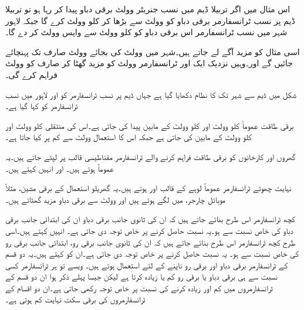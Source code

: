 اس مثال میں اگر تربیلا ڈیم میں نسب جنریٹر  وولٹ برقی دباو پیدا کر رہا ہو تو تربیلا ڈیم  پر نسب  ٹرانسفارمر برقی دباو کو  وولٹ سے بڑھا کر  کلو وولٹ کرے گا جبکہ لاہور شہر میں نسب  ٹرانسفارمر اس برقی دباو کو  کلو وولٹ سے واپس  وولٹ کر دے گا۔

اسی مثال کو مزید آگے لے جاتے ہیں۔شہر میں  وولٹ کی بجائے  وولٹ صارف تک پہنچائے جائیں گے اور۔وہیں نزدیک ایک اور ٹرانسفارمر    وولٹ کو مزید گھٹا کر صارف کو   وولٹ فراہم کرے گی۔ 

شکل  میں ڈیم سے شہر تک کا نظام دکھایا گیا ہے جہاں ڈیم پر نسب ٹرانسفارمر کو   اور لاہور میں نسب ٹرانسفارمر کو   کہا گیا ہے۔

برقی طاقت عموماً  کلو وولٹ اور   کلو وولٹ کے مابین پیدا کی جاتی ہے۔اس کی منتقلی   کلو وولٹ اور   کلو وولٹ کے مابین کی جاتی ہے جبکہ اس کا استعمال   وولٹ سے کم پر کیا جاتا ہے۔

گھروں اور کارخانوں کو برقی طاقت فراہم کرنے والے ٹرانسفارمر مقناطیسی قالب پر لپٹے جاتے ہیں۔یہ عموماً   ہوتے ہیں۔ اور انہیں  کہتے ہیں۔

نہایت چھوٹے ٹرانسفارمر عموماً لوہے کے قالب اور  ہوتے ہیں۔یہ گھریلو استعمال کے برقی مشین، مثلاً موبائل چارجر، میں لگے ہوتے ہیں اور  وولٹ سے برقی دباو مزید گھٹاتے ہیں۔

کچھ ٹرانسفارمر اس طرح بنائے جاتے ہیں کہ ان کی ثانوی جانب برقی دباو ان کی ابتدائی جانب برقی دباو کی خاص نسبت سے ہو۔یہ نسبت حاصل کرنے پر خاص توجہ دی جاتی ہے۔ انہیں    کہتے ہیں۔اسی طرح کچھ ٹرانسفارمر اس طرح بنائے جاتے ہیں کہ ان کی ثانوی جانب برقی رو، ابتدائی جانب برقی رو کی خاص نسبت سے ہو۔ یہ نسبت حاصل کرنے پر خاص توجہ دی جاتی ہے۔ان کو   کہتے ہیں۔یہ دو قسم کے ٹرانسفارمر برقی دباو اور برقی رو ناپنے کے لئے استعمال ہوتے ہیں۔ ویسے تو ہر ٹرانسفارمر کسی نسبت سے ہی برقی دباو یا برقی رو کم یا زیادہ کرتا ہے لیکن جیسا پہلے ذکر ہوا ان دو قسم کے ٹرانسفارمروں میں کم اور زیادہ کرنے کی نسبت پر خاص توجہ رکھی جاتی ہے۔ان دو اقسام کے ٹرانسفارمروں کی برقی سکت نہایت کم ہوتی ہے۔

